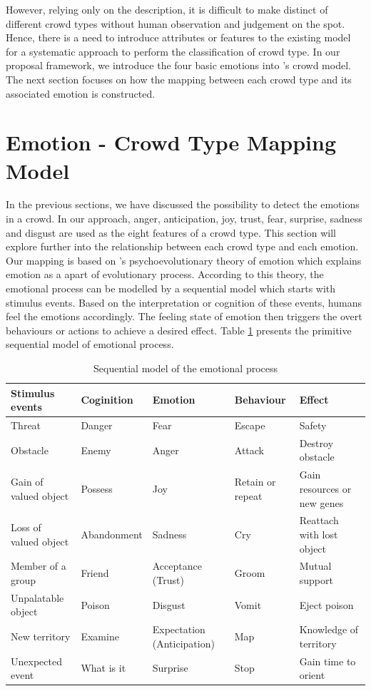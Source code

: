 However, relying only on the description, it is difficult to make distinct of different crowd types without human observation and judgement on the spot. Hence, there is a need to introduce attributes or features to the existing model for a systematic approach to perform the classification of crowd type. In our proposal framework, we introduce the four basic emotions into \citet{Berlonghi1995}'s crowd model. The next section focuses on how the mapping between each crowd type and its associated emotion is constructed.

\section{Emotion - Crowd Type Mapping Model}
In the previous sections, we have discussed the possibility to detect the emotions in a crowd. In our approach, anger, anticipation, joy, trust, fear, surprise, sadness and disgust are used as the eight features of a crowd type. This section will explore further into the relationship between each crowd type and each emotion. Our mapping is based on \citet{Plutchik1980}'s psychoevolutionary theory of emotion which explains emotion as a apart of evolutionary process. According to this theory, the emotional process can be modelled by a sequential model which starts with stimulus events. Based on the interpretation or cognition of these events, humans feel the emotions accordingly. The feeling state of emotion then triggers the overt behaviours or actions to achieve a desired effect. Table \ref{table:sequentialModelOfEmotion} presents the primitive sequential model of emotional process.

\begin{table}
\caption{Sequential model of the emotional process}
\label{table:sequentialModelOfEmotion}
\begin{tabular}{|p{2.5cm}|p{2.5cm}|p{2cm}|p{2cm}|p{4.5cm}|}
\hline
\textbf{Stimulus events} & \textbf{Coginition} & \textbf{Emotion} & \textbf{Behaviour} & \textbf{Effect} \\
\hline
Threat & Danger & Fear & Escape & Safety \\
\hline
Obstacle & Enemy & Anger & Attack & Destroy obstacle \\
\hline
Gain of valued object & Possess & Joy & Retain or repeat & Gain resources or new genes \\
\hline
Loss of valued object & Abandonment & Sadness & Cry & Reattach with lost object \\
\hline
Member of a group & Friend & Acceptance (Trust) & Groom & Mutual support \\
\hline
Unpalatable object & Poison & Disgust & Vomit & Eject poison \\
\hline
New territory & Examine & Expectation (Anticipation) & Map & Knowledge of territory \\
\hline
Unexpected event & What is it & Surprise & Stop & Gain time to orient \\
\hline
\end{tabular}
\end{table}

